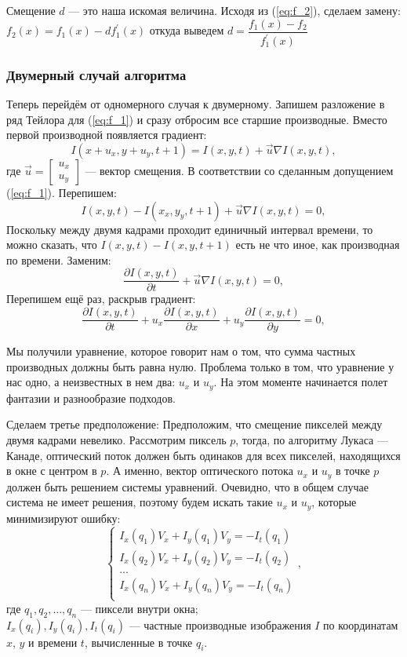 Смещение $d$ — это наша искомая величина. Исходя из (\ref{eq:f_2}), сделаем замену:$f_2(x)=f_1(x)-df_1^{'}(x)$
откуда выведем $d = \dfrac{f_1(x)-f_2}{f_1^{'}(x)}$
\subsubsection{Двумерный случай алгоритма}

Теперь перейдём от одномерного случая к двумерному. Запишем разложение в ряд Тейлора для (\ref{eq:f_1}) и сразу отбросим все старшие производные. Вместо первой производной появляется градиент:
$$I(x+u_x,y+u_y,t+1)=I(x,y,t)+\overrightarrow{u} \nabla I(x,y,t),$$
где $\overrightarrow{u} = \begin{bmatrix}
u_x\\
u_y
\end{bmatrix} $ — вектор смещения.
В соответствии со сделанным допущением (\ref{eq:f_1}). Перепишем:
$$I(x,y,t)-I(x_x,y_y,t+1) + \overrightarrow{u} \nabla I(x,y,t) = 0,$$
Поскольку между двумя кадрами проходит единичный интервал времени, то можно сказать, что $I(x,y,t)-I(x,y,t+1)$ есть не что иное, как производная по времени.
Заменим:
$$\frac{\partial I(x,y,t)}{\partial t} + \overrightarrow{u} \nabla I(x,y,t) = 0,$$
Перепишем ещё раз, раскрыв градиент:
$$\frac{\partial I(x,y,t)}{\partial t} + u_x\frac{\partial I(x,y,t)}{\partial x} + u_y\frac{\partial I(x,y,t)}{\partial y} = 0,$$

Мы получили уравнение, которое говорит нам о том, что сумма частных производных должны быть равна нулю. Проблема только в том, что уравнение у нас одно, а неизвестных в нем два: $u_x$ и $u_y$. На этом моменте начинается полет фантазии и разнообразие подходов.

Сделаем третье предположение: Предположим, что смещение пикселей между двумя кадрами невелико. Рассмотрим пиксель $p$, тогда, по алгоритму Лукаса — Канаде, оптический поток должен быть одинаков для всех пикселей, находящихся в окне с центром в $p$. А именно, вектор оптического потока $u_x$ и $u_y$ в точке $p$ должен быть решением системы уравнений. Очевидно, что в общем случае система не имеет решения, поэтому будем искать такие $u_x$ и $u_y$, которые минимизируют ошибку:
$$
\begin{cases}
I_x(q_1) V_x + I_y (q_1) V_y = -I_t(q_1)\\
I_x(q_2) V_x + I_y (q_2) V_y = -I_t(q_2)\\
...\\
I_x(q_n) V_x + I_y (q_n) V_y = -I_t(q_n)\\
\end{cases},
$$
где $q_1,q_2,\dots,q_n$ — пиксели внутри окна;\\
$I_x(q_i),I_y(q_i),I_t(q_i)$ — частные производные изображения $I$ по координатам $x$, $y$ и времени $t$, вычисленные в точке $q_i$.

